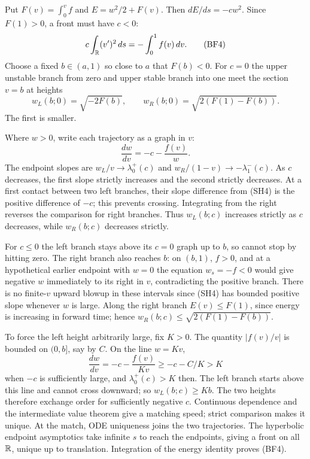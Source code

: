 Put $F(v)=\int_0^vf$ and $E=w^2/2+F(v)$.
Then $dE/ds=-cw^2$. Since $F(1)>0$, a front must have $c<0$:
\[
 c\int_{\mathbb{R}}(v')^2\,ds=-\int_0^1f(v)\,dv .
 \tag{BF4}
\]
Choose a fixed $b\in(a,1)$ so close to $a$ that $F(b)<0$.
For $c=0$ the upper unstable branch from zero and upper stable
branch into one meet the section $v=b$ at heights
\[
 w_L(b;0)=\sqrt{-2F(b)},\qquad
 w_R(b;0)=\sqrt{2(F(1)-F(b))}.
\]
The first is smaller.

\begin{expandedproof}
Where $w>0$, write each trajectory as a graph in $v$:
\[
 \frac{dw}{dv}=-c-\frac{f(v)}w .
 \tag{SH4}
\]
The endpoint slopes are
$w_L/v\to\lambda_0^+(c)$ and
$w_R/(1-v)\to-\lambda_1^-(c)$.
As $c$ decreases, the first slope strictly increases and the second
strictly decreases. At a first contact between two left branches,
their slope difference from (SH4) is the positive difference of $-c$;
this prevents crossing. Integrating from the right reverses the
comparison for right branches.
Thus $w_L(b;c)$ increases strictly as $c$ decreases, while
$w_R(b;c)$ decreases strictly.

For $c\leq0$ the left branch stays above its $c=0$ graph up to $b$,
so cannot stop by hitting zero.
The right branch also reaches $b$: on $(b,1)$, $f>0$,
and at a hypothetical earlier endpoint with $w=0$ the equation
$w_s=-f<0$ would give negative $w$ immediately to its right in $v$,
contradicting the positive branch.
There is no finite-$v$ upward blowup in these intervals since (SH4)
has bounded positive slope whenever $w$ is large.
Along the right branch $E(v)\leq F(1)$, since energy is increasing
in forward time; hence
$w_R(b;c)\leq\sqrt{2(F(1)-F(b))}$.

To force the left height arbitrarily large, fix $K>0$.
The quantity $|f(v)/v|$ is bounded on $(0,b]$, say by $C$.
On the line $w=Kv$,
\[
 \frac{dw}{dv}=-c-\frac{f(v)}{Kv}\geq-c-C/K>K
\]
when $-c$ is sufficiently large, and
$\lambda_0^+(c)>K$ then.
The left branch starts above this line and cannot cross downward;
so $w_L(b;c)\geq Kb$.
The two heights therefore exchange order for sufficiently negative $c$.
Continuous dependence and the intermediate value theorem give a
matching speed; strict comparison makes it unique.
At the match, ODE uniqueness joins the two trajectories.
The hyperbolic endpoint asymptotics take infinite $s$ to reach the
endpoints, giving a front on all $\mathbb{R}$, unique up to translation.
Integration of the energy identity proves (BF4).
\end{expandedproof}
\Needspace{45mm}

